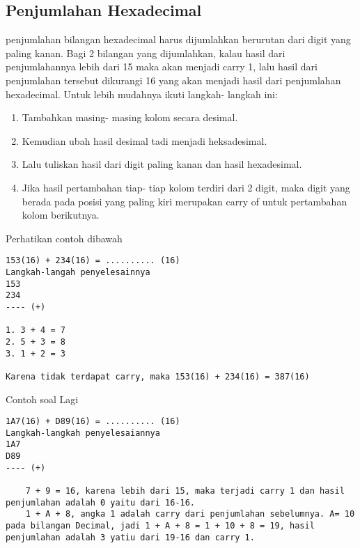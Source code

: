 	\subsection {Penjumlahan Hexadecimal}
penjumlahan bilangan hexadecimal harus dijumlahkan berurutan dari digit yang paling kanan. Bagi 2 bilangan yang dijumlahkan, kalau hasil dari penjumlahannya lebih dari 15 maka akan menjadi carry 1, lalu hasil dari penjumlahan tersebut dikurangi 16 yang akan menjadi hasil dari penjumlahan hexadecimal.
Untuk lebih mudahnya ikuti langkah- langkah ini:
		\begin{enumerate}
			\item Tambahkan masing- masing kolom secara desimal.
			\item Kemudian ubah hasil desimal tadi menjadi heksadesimal.
			\item Lalu tuliskan hasil dari digit paling kanan dan hasil hexadesimal.
			\item Jika hasil pertambahan tiap- tiap kolom terdiri dari 2 digit, maka digit yang berada pada posisi yang paling kiri merupakan carry of untuk pertambahan kolom berikutnya.
		\end{enumerate}
			
Perhatikan contoh dibawah
\begin{verbatim}
153(16) + 234(16) = .......... (16) 
Langkah-langah penyelesainnya
153 
234 
---- (+)

1. 3 + 4 = 7
2. 5 + 3 = 8
3. 1 + 2 = 3

Karena tidak terdapat carry, maka 153(16) + 234(16) = 387(16)
\end{verbatim}
Contoh soal Lagi 
\begin{verbatim}
1A7(16) + D89(16) = .......... (16)
Langkah-langkah penyelesaiannya
1A7
D89
---- (+)

	7 + 9 = 16, karena lebih dari 15, maka terjadi carry 1 dan hasil penjumlahan adalah 0 yaitu dari 16-16.
	1 + A + 8, angka 1 adalah carry dari penjumlahan sebelumnya. A= 10 pada bilangan Decimal, jadi 1 + A + 8 = 1 + 10 + 8 = 19, hasil penjumlahan adalah 3 yatiu dari 19-16 dan carry 1.
\end{verbatim}

